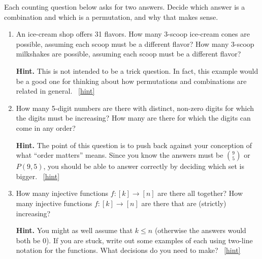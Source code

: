 \documentclass{book}
\begin{document}
\setcounter{project}{116}
\addtocounter{project}{-1}
\begin{activity}[]\label{activity-109}
\hypertarget{p-805}{}%
Each counting question below asks for two answers.  Decide which answer is a combination and which is a permutation, and why that makes sense.%
\begin{enumerate}[font=\bfseries,label=(\alph*),ref=\alph*]
\item\label{task-149} \hypertarget{p-806}{}%
An ice-cream shop offers 31 flavors.  How many 3-scoop ice-cream cones are possible, assuming each scoop must be a different flavor?  How many 3-scoop milkshakes are possible, assuming each scoop must be a different flavor?%
\par\smallskip%
\noindent\textbf{Hint.}\hypertarget{hint-73}{}\quad%
\hypertarget{p-807}{}%
This is not intended to be a trick question.  In fact, this example would be a good one for thinking about how permutations and combinations are related in general.%
~\hfill{\tiny\hyperlink{a-116.a}{[hint]}\hypertarget{q-116.a}{}}\item\label{task-150} \hypertarget{p-808}{}%
How many 5-digit numbers are there with distinct, non-zero digits for which the digits must be increasing?  How many are there for which the digits can come in any order?%
\par\smallskip%
\noindent\textbf{Hint.}\hypertarget{hint-74}{}\quad%
\hypertarget{p-809}{}%
The point of this question is to push back against your conception of what ``order matters'' means.  Since you know the answers must be \(\binom{9}{5}\) or \(P(9,5)\), you should be able to answer correctly by deciding which set is bigger.%
~\hfill{\tiny\hyperlink{a-116.b}{[hint]}\hypertarget{q-116.b}{}}\item\label{task-151} \hypertarget{p-810}{}%
How many injective functions \(f:[k] \to [n]\) are there all   together?  How many injective functions \(f:[k] \to [n]\) are there that are (strictly) increasing?%
\par\smallskip%
\noindent\textbf{Hint.}\hypertarget{hint-75}{}\quad%
\hypertarget{p-811}{}%
You might as well assume that \(k \le n\) (otherwise the answers would both be 0).  If you are stuck, write out some examples of each using two-line notation for the functions.  What decisions do you need to make?%
~\hfill{\tiny\hyperlink{a-116.c}{[hint]}\hypertarget{q-116.c}{}}\end{enumerate}
\end{activity}

\clearpage
\end{document}
